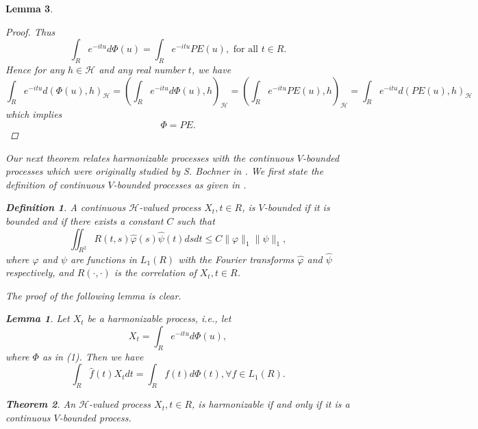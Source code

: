 \documentclass{article}
\newtheorem{theorem}{Theorem}
\newtheorem{lemma}[theorem]{Lemma}
\newtheorem{definition}{Definition}
\begin{document}
\begin{lemma}
\begin{enumerate}
\begin{proof}
Thus
\begin{equation}
\int_R e^{-itu} d\Phi(u) = \int_R e^{-itu} PE(u), \text{ for all } t \in R.
\end{equation}
Hence for any $h \in \mathscr{H}$ and any real number $t$, we have
\begin{equation}
\int_R e^{-itu} d(\Phi(u), h)_{\mathscr{H}} = \left(\int_R e^{-itu} d\Phi(u), h\right)_{\mathscr{H}} = \left(\int_R e^{-itu} PE(u), h\right)_{\mathscr{H}} = \int_R e^{-itu} d(PE(u), h)_{\mathscr{H}}
\end{equation}
which implies
\begin{equation}
\Phi = PE.
\end{equation}
\end{proof}

Our next theorem relates harmonizable processes with the continuous $V$-bounded processes which were originally studied by S. Bochner in \cite{bochner}. We first state the definition of continuous $V$-bounded processes as given in \cite{niemi4}.

\begin{definition}
A continuous $\mathscr{H}$-valued process $X_t, t \in R$, is $V$-bounded if it is bounded and if there exists a constant $C$ such that
\begin{equation}
\iint_{R^2} R(t,s)\hat{\varphi}(s)\hat{\psi}(t)ds dt \leq C \|\varphi\|_1\|\psi\|_1,
\end{equation}
where $\varphi$ and $\psi$ are functions in $L_1(R)$ with the Fourier transforms $\hat{\varphi}$ and $\hat{\psi}$ respectively, and $R(\cdot, \cdot)$ is the correlation of $X_t, t \in R$.
\end{definition}

The proof of the following lemma is clear.

\begin{lemma}
Let $X_t$ be a harmonizable process, i.e., let
\begin{equation}
X_t = \int_R e^{-itu} d\Phi(u),
\end{equation}
where $\Phi$ as in (1). Then we have
\begin{equation}
\int_R \hat{f}(t)X_t dt = \int_R f(t)d\Phi(t), \forall f \in L_1(R).
\end{equation}
\end{lemma}

\begin{theorem}
An $\mathscr{H}$-valued process $X_t, t \in R$, is harmonizable if and only if it is a continuous $V$-bounded process.
\end{theorem}


\end{enumerate}
\end{lemma}
\end{document}
